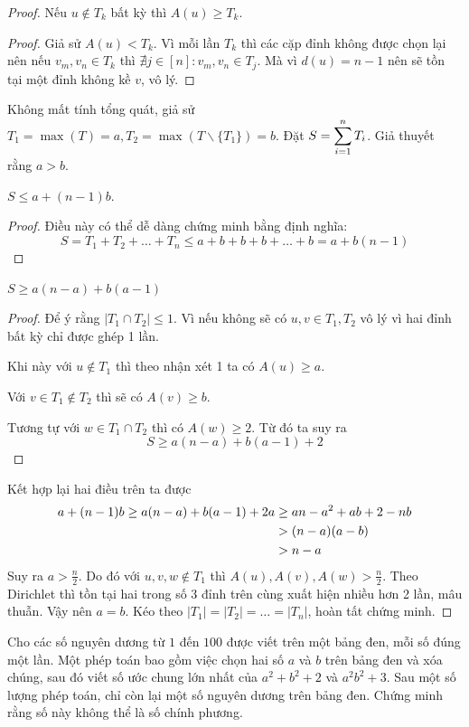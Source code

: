 \documentclass[11pt]{scrartcl}
\begin{document}
\begin{itemize}[label=, leftmargin=0em, itemsep=0.5em]
\begin{proof}
         Nếu $u \notin T_k$ bất kỳ thì $A(u) \geq T_k$.
        \begin{proof}
            Giả sử $A(u) < T_k$. Vì mỗi lần $T_k$ thì các cặp đỉnh không được chọn lại nên nếu $v_m,v_n \in T_k$ thì $\nexists j \in [n]: v_m,v_n \in T_j$. Mà vì $d(u) = n - 1$ nên sẽ tồn tại một đỉnh không kề $v$, vô lý.
        \end{proof}
        Không mất tính tổng quát, giả sử $T_1 = \max(T) = a, T_2 = \max(T \backslash \{T_1\}) = b$. Đặt $S = \displaystyle\sum_{i = 1}^n T_i$. Giả thuyết rằng $a > b$.

         $S \leq a +(n - 1)b$. 
        \begin{proof}
            Điều này có thể dễ dàng chứng minh bằng định nghĩa:
            \[
                S = T_1 + T_2 + \dots + T_n  \leq a + b + b + b +\dots + b = a + b(n - 1)
            \]
        \end{proof}
          $S \geq a(n - a) + b(a - 1)$
        \begin{proof}
            Để ý rằng $|T_1 \cap T_2| \leq 1$. Vì nếu không sẽ có $u,v \in T_1,T_2$ vô lý vì hai đỉnh bất kỳ chỉ được ghép 1 lần. 
            
            Khi này với $u  \notin T_1$ thì theo nhận xét 1 ta có $A(u) \geq a$. 
            
            Với $v \in T_1 \notin T_2$ thì sẽ có $A(v) \geq b$. 

            Tương tự với $w \in T_1 \cap T_2$ thì có $A(w) \geq 2$. Từ đó ta suy ra 
            \[
                S \geq a(n - a) + b(a - 1) + 2
            \]
        \end{proof}
        Kết hợp lại hai điều trên ta được 
        \[
        \begin{aligned}
            a + (n - 1)b \geq a(n - a) + b(a - 1) + 2 \lra a &\geq an -a^2 + ab  + 2 -nb\\
             &> (n - a)(a - b) \\
             &> n - a 
        \end{aligned}
        \]
        Suy ra $a > \frac{n}{2}$. Do đó với $u,v,w \notin T_1$ thì $A(u),A(v),A(w) > \frac{n}{2}$. Theo Dirichlet thì tồn tại hai trong số 3 đỉnh trên cùng xuất hiện nhiều hơn 2 lần, mâu thuẫn. Vậy nên $a = b$. Kéo theo $|T_1| = |T_2| =\dots = |T_n|$, hoàn tất chứng minh.
    \end{proof}
    \begin{bt}
        Cho các số nguyên dương từ $1$ đến $100$ được viết trên một bảng đen, mỗi số đúng một lần. Một phép toán bao gồm việc chọn hai số $a$ và $b$ trên bảng đen và xóa chúng, sau đó viết số ước chung lớn nhất của $a^2+b^2+2$ và $a^2b^2+3$. Sau một số lượng phép toán, chỉ còn lại một số nguyên dương trên bảng đen. Chứng minh rằng số này không thể là số chính phương.
    \end{bt}


\end{itemize}
\end{document}
